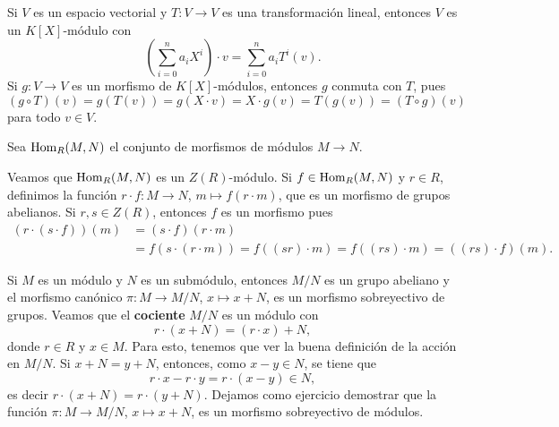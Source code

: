 \begin{example}
Si $V$ es un espacio vectorial y $T\colon V\to V$ es una transformación lineal, entonces
$V$ es un $K[X]$-módulo con 
\[
\left(\sum_{i=0}^n a_iX^i\right)\cdot v=\sum_{i=0}^n a_iT^i(v).
\]
Si $g\colon V\to V$ es un morfismo de $K[X]$-módulos, entonces $g$ conmuta con $T$, pues
\[
(g\circ T)(v)=g(T(v))=g(X\cdot v)=X\cdot g(v)=T(g(v))=(T\circ g)(v)
\]
para todo $v\in V$.
%
%
%
\end{example}

Sea $\operatorname{Hom}_R(M,N)$ el conjunto de morfismos de módulos $M\to N$. 

\begin{example}
\label{exa:Hom}
Veamos que $\operatorname{Hom}_R(M,N)$ es un $Z(R)$-módulo. Si $f\in\operatorname{Hom}_R(M,N)$ y $r\in R$, definimos la función 
$r\cdot f\colon M\to N$, $m\mapsto f(r\cdot m)$, que es un morfismo de grupos abelianos. 
Si $r,s\in Z(R)$, entonces $f$ es un morfismo pues
\begin{align*}
(r\cdot (s\cdot f))(m)&=
(s\cdot f)(r\cdot m)\\
&=f(s\cdot (r\cdot m))=f((sr)\cdot m)=f( (rs)\cdot m)=((rs)\cdot f)(m). 
\end{align*} 	
\end{example}

Si $M$ es un módulo y $N$ es un submódulo, entonces $M/N$ es un grupo abeliano y el morfismo
canónico $\pi\colon M\to M/N$, $x\mapsto x+N$, es un morfismo sobreyectivo de grupos. Veamos que 
el \textbf{cociente} $M/N$ es un módulo con 
\[
r\cdot (x+N)=(r\cdot x)+N,
\]
donde $r\in R$ y $x\in M$. Para esto, tenemos que ver la buena definición de la acción en $M/N$. Si $x+N=y+N$, entonces, como
$x-y\in N$, se tiene que 
\[
r\cdot x-r\cdot y=r\cdot (x-y)\in N,
\]
es decir $r\cdot (x+N)=r\cdot (y+N)$. Dejamos como ejercicio demostrar que la función $\pi\colon M\to M/N$, $x\mapsto x+N$, es
un morfismo sobreyectivo de módulos. 

